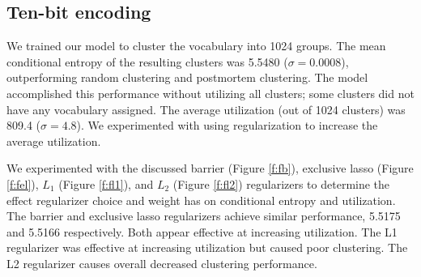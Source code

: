 \documentclass[11pt,letterpaper]{article}
\begin{document}
\subsection{Ten-bit encoding}

We trained our model to cluster the vocabulary into 1024 groups. The mean conditional entropy of the resulting clusters was 5.5480 ($\sigma=0.0008$), outperforming random clustering and postmortem clustering. The model accomplished this performance without utilizing all clusters; some clusters did not have any vocabulary assigned. The average utilization (out of 1024 clusters) was 809.4 ($\sigma=4.8$). We experimented with using regularization to increase the average utilization.

We experimented with the discussed barrier (Figure \ref{f:fb}), exclusive lasso (Figure \ref{f:fel}), $L_1$ (Figure \ref{f:fl1}), and $L_2$ (Figure \ref{f:fl2}) regularizers to determine the effect regularizer choice and weight has on conditional entropy and utilization. The barrier and exclusive lasso regularizers achieve similar performance, 5.5175 and 5.5166 respectively. Both appear effective at increasing utilization. The L1 regularizer was effective at increasing utilization but caused poor clustering. The L2 regularizer causes overall decreased clustering performance.
\end{document}
